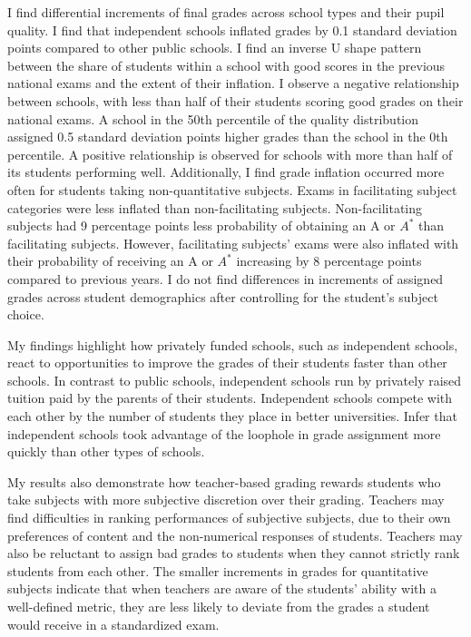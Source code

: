 I find differential increments of final grades across school types and their pupil quality. I find that independent schools inflated grades by 0.1 standard deviation points compared to other public schools. I find an inverse U shape pattern between the share of students within a school with good scores in the previous national exams and the extent of their inflation. I observe a negative relationship between schools, with less than half of their students scoring good grades on their national exams. A school in the 50th percentile of the quality distribution assigned 0.5 standard deviation points higher grades than the school in the 0th percentile. A positive relationship is observed for schools with more than half of its students performing well. Additionally, I find grade inflation occurred more often for students taking non-quantitative subjects. Exams in facilitating subject categories were less inflated than non-facilitating subjects. Non-facilitating subjects had 9 percentage points less probability of obtaining an A or $A^*$ than facilitating subjects. However, facilitating subjects' exams were also inflated with their probability of receiving an A or $A^*$ increasing by 8 percentage points compared to previous years. I do not find differences in increments of assigned grades across student demographics after controlling for the student's subject choice.

My findings highlight how privately funded schools, such as independent schools, react to opportunities to improve the grades
of their students faster than other schools. In contrast to public schools, independent schools run by privately raised tuition paid by the parents of their students. Independent schools compete with each other by the number of students they place in better universities. Infer that independent schools took advantage of the loophole in grade assignment more quickly than other types of schools. 

My results also demonstrate how teacher-based grading rewards students who take subjects with more subjective discretion over their grading. Teachers may find difficulties in ranking performances of subjective subjects, due to their own preferences of content and the non-numerical responses of students. Teachers may also be reluctant to assign bad grades to students when they cannot strictly rank students from each other. The smaller increments in grades for quantitative subjects indicate that when teachers are aware of the students' ability with a well-defined metric, they are less likely to deviate from the grades a student would receive in a standardized exam. 



